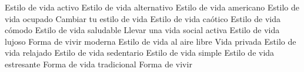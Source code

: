              {}                  {\typeExpression}           {Estilo de vida activo}         {}
        {}                  {\typeExpression}           {Estilo de vida alternativo}    {}
         {}                  {\typeExpression}           {Estilo de vida americano}      {}
               {}                  {\typeExpression}           {Estilo de vida ocupado}        {}
        {}                  {\typeExpression}           {Cambiar tu estilo de vida}     {}
            {}                  {\typeExpression}           {Estilo de vida caótico}        {}
        {}                  {\typeExpression}           {Estilo de vida cómodo}         {}
            {}                  {\typeExpression}           {Estilo de vida saludable}      {}
   {}                  {\typeExpression}           {Llevar una vida social activa} {}
          {}                  {\typeExpression}           {Estilo de vida lujoso}         {}
           {}                  {\typeExpression}           {Forma de vivir moderna}        {}
            {}                  {\typeExpression}           {Estilo de vida al aire libre}  {}
                 {}                  {\typeExpression}           {Vida privada}                  {}
            {}                  {\typeExpression}           {Estilo de vida relajado}       {}
          {}                  {\typeExpression}           {Estilo de vida sedentario}     {}
             {}                  {\typeExpression}           {Estilo de vida simple}         {}
          {}                  {\typeExpression}           {Estilo de vida estresante}     {}
      {}                  {\typeExpression}           {Forma de vida tradicional}     {}
                  {}                  {\typeExpression}           {Forma de vivir}                {}
